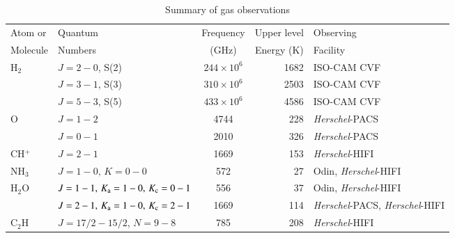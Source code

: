 \documentclass{aa}
\newcommand{\molh}{H$_{2}$}                              %
\newcommand{\water}{H$_{2}$O}
\newcommand{\ammonia}{{\rm NH}$_3$}
\begin{document}
\begin{table}[h]
\caption{Summary of gas observations}             %
\label{obs_sum}      %
\begin{tabular}{llcrl}    %
\hline\hline    
\noalign{\smallskip}             
Atom     or             & Quantum       &    Frequency          & Upper level         & Observing              \\
Molecule                & Numbers       &   (GHz)                       & Energy (K)      & Facility                      \\
\noalign{\smallskip}    
\hline                        %
\noalign{\smallskip}    
\noalign{\smallskip}    
\molh                   &$J=2-0$, S(2)                                          & $244 \times 10^6$       &1682   & ISO-CAM CVF \\
                                &$J=3-1$, S(3)                                  & $310 \times 10^6$       &2503   & ISO-CAM CVF \\
                                &$J=5-3$, S(5)                                          & $433 \times 10^6$ &4586 & ISO-CAM CVF \\
O                               &$J=1-2$                                                        & 4744                    & 228   & {\it Herschel}-PACS \\
                                &$J=0-1$                                                        & 2010                    & 326   & {\it Herschel}-PACS \\
CH$^+$                  &$J=2-1$                                                        & 1669                    & 153   & {\it Herschel}-HIFI   \\                              
\ammonia                        &$J=1-0,\,K=0-0$                                        &  572                    &   27  & Odin,  {\it Herschel}-HIFI \\ 
\water                  &$J=1-1,\,K_{\rm a}=1-0,\,K_{\rm c}=0-1$        & 556                     &   37  & Odin,  {\it Herschel}-HIFI    \\
                                &$J=2-1,\,K_{\rm a}=1-0,\,K_{\rm c}=2-1$         & 1669                  & 114   &  {\it Herschel}-PACS, {\it Herschel}-HIFI     \\              
C$_2$H                  & $J=17/2-15/2$, $N=9-8$                        & 785                     & 208   & {\it Herschel}-HIFI   \\      

\end{tabular}
\end{table}
\end{document}
